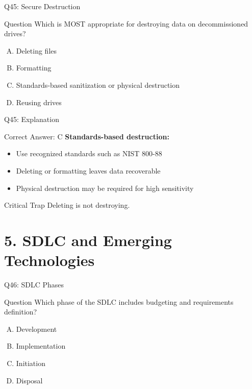 \documentclass{beamer}
\begin{document}
	\begin{frame}{Q45: Secure Destruction}
		\begin{block}{Question}
			Which is MOST appropriate for destroying data on decommissioned drives?
		\end{block}
		\begin{enumerate}[(A)]
			\item Deleting files
			\item Formatting
			\item Standards-based sanitization or physical destruction
			\item Reusing drives
		\end{enumerate}
	\end{frame}
	
	\begin{frame}{Q45: Explanation}
		\begin{block}{Correct Answer: C}
			\textbf{Standards-based destruction:}
			\begin{itemize}
				\item Use recognized standards such as NIST 800-88
				\item Deleting or formatting leaves data recoverable
				\item Physical destruction may be required for high sensitivity
			\end{itemize}
		\end{block}
		\begin{alertblock}{Critical Trap}
			Deleting is not destroying.
		\end{alertblock}
	\end{frame}
	
	\section{5. SDLC and Emerging Technologies}
	
	\begin{frame}{Q46: SDLC Phases}
		\begin{block}{Question}
			Which phase of the SDLC includes budgeting and requirements definition?
		\end{block}
		\begin{enumerate}[(A)]
			\item Development
			\item Implementation
			\item Initiation
			\item Disposal
		\end{enumerate}
	\end{frame}
	
\end{document}
